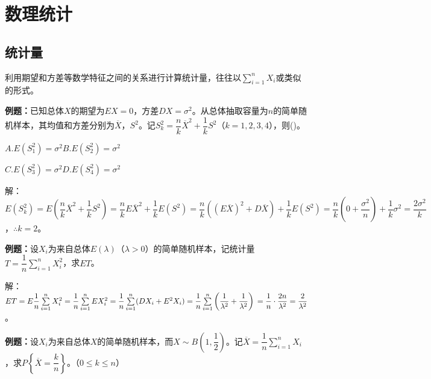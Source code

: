 \setcounter{tocdepth}{4}
\setcounter{secnumdepth}{4}
\renewcommand{\baselinestretch}{1.5}
\chapter{数理统计}
\section{统计量}

利用期望和方差等数学特征之间的关系进行计算统计量，往往以$\sum\limits_{i=1}^nX_i$或类似的形式。

\textbf{例题：}已知总体$X$的期望为$EX=0$，方差$DX=\sigma^2$。从总体抽取容量为$n$的简单随机样本，其均值和方差分别为$\overline{X}$，$S^2$。记$S_k^2=\dfrac{n}{k}\overline{X}^2+\dfrac{1}{k}S^2$（$k=1,2,3,4$），则()。

$A.E(S_1^2)=\sigma^2$\qquad$B.E(S_2^2)=\sigma^2$

$C.E(S_3^2)=\sigma^2$\qquad$D.E(S_4^2)=\sigma^2$

解：$E(S_k^2)=E\left(\dfrac{n}{k}\overline{X}^2+\dfrac{1}{k}S^2\right)=\dfrac{n}{k}E\overline{X}^2+\dfrac{1}{k}E(S^2)=\dfrac{n}{k}((E\overline{X})^2+D\overline{X})+\dfrac{1}{k}E(S^2)=\dfrac{n}{k}\left(0+\dfrac{\sigma^2}{n}\right)+\dfrac{1}{k}\sigma^2=\dfrac{2\sigma^2}{k}$，$\therefore k=2$。

\textbf{例题：}设$X_i$为来自总体$E(\lambda)$（$\lambda>0$）的简单随机样本，记统计量$T=\dfrac{1}{n}\sum\limits_{i=1}^nX_i^2$，求$ET$。

解：$ET=E\dfrac{1}{n}\sum\limits_{i=1}^nX_i^2=\dfrac{1}{n}\sum\limits_{i=1}^nEX_i^2=\dfrac{1}{n}\sum\limits_{i=1}^n(DX_i+E^2X_i)=\dfrac{1}{n}\sum\limits_{i=1}^n\left(\dfrac{1}{\lambda^2}+\dfrac{1}{\lambda^2}\right)\\=\dfrac{1}{n}\cdot\dfrac{2n}{\lambda^2}=\dfrac{2}{\lambda^2}$。

\textbf{例题：}设$X_i$为来自总体$X$的简单随机样本，而$X\sim B\left(1,\dfrac{1}{2}\right)$。记$\overline{X}=\dfrac{1}{n}\sum\limits_{i=1}^nX_i$，求$P\left\{\overline{X}=\dfrac{k}{n}\right\}$。（$0\leqslant k\leqslant n$）

